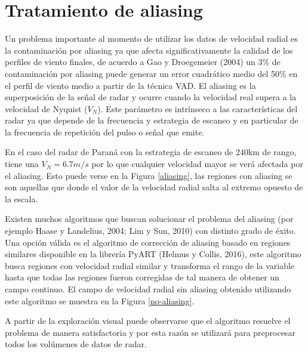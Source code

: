 \documentclass[12pt,spanish,oneside]{book}
\begin{document}
\section{Tratamiento de aliasing}\label{tratamiento-de-aliasing}

Un problema importante al momento de utilizar los datos de velocidad
radial es la contaminación por aliasing ya que afecta significativamente
la calidad de los perfiles de viento finales, de acuerdo a Gao y
Droegemeier (2004) un 3\% de contaminación por aliasing puede generar un
error cuadrático medio del 50\% en el perfil de viento medio a partir de
la técnica VAD. El aliasing es la superposición de la señal de radar y
ocurre cuando la velocidad real supera a la velocidad de Nyquist
(\(V_N\)). Este parámetro es intrínseco a las características del radar
ya que depende de la frecuencia y estrategia de escaneo y en particular
de la frecuencia de repetición del pulso o señal que emite.

En el caso del radar de Paraná con la estrategia de escaneo de 240km de
rango, tiene una \(V_N = 6.7 m/s\) por lo que cualquier velocidad mayor
se verá afectada por el aliasing. Esto puede verse en la Figura
\ref{aliasing}, las regiones con aliasing se son aquellas que donde el
valor de la velocidad radial salta al extremo opuesto de la escala.

Existen muchos algoritmos que buscan solucionar el problema del aliasing
(por ejemplo Haase y Landelius, 2004; Lim y Sun, 2010) con distinto
grado de éxito. Una opción válida es el algoritmo de corrección de
aliasing basado en regiones similares disponible en la librería PyART
(Helmus y Collis, 2016), este algoritmo busca regiones con velocidad
radial similar y transforma el rango de la variable hasta que todas las
regiones fueron corregidas de tal manera de obtener un campo continuo.
El campo de velocidad radial sin aliasing obtenido utilizando este
algoritmo se muestra en la Figura \ref{no-aliasing}.

A partir de la exploración visual puede observarse que el algoritmo
resuelve el problema de manera satisfactoria y por esta razón se
utilizará para preprocesar todos los volúmenes de datos de radar.
\end{document}
